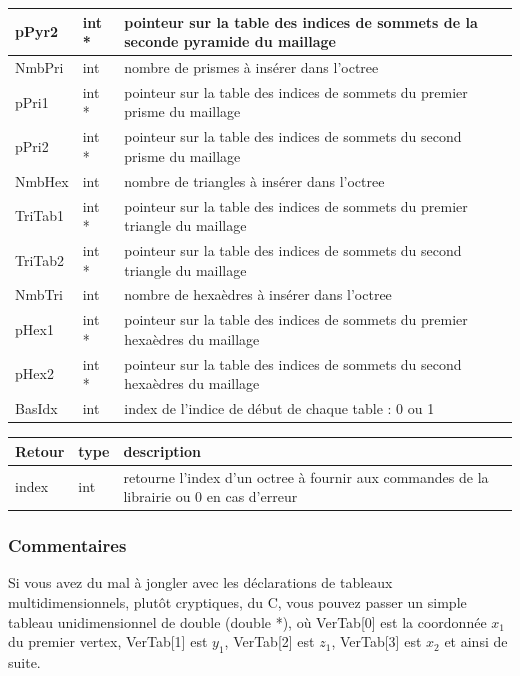 \documentclass[a4paper,12pt]{article}
\begin{document}
\begin{tabular}{|m{2cm}|m{2cm}|m{10cm}|}
\hline
pPyr2      & int *    & pointeur sur la table des indices de sommets de la seconde pyramide du maillage \\
\hline
NmbPri     & int      & nombre de prismes à insérer dans l'octree  \\
\hline
pPri1      & int *    & pointeur sur la table des indices de sommets du premier prisme du maillage \\
\hline
pPri2      & int *    & pointeur sur la table des indices de sommets du second prisme du maillage \\
\hline
NmbHex     & int      & nombre de triangles à insérer dans l'octree  \\
\hline
TriTab1    & int *    & pointeur sur la table des indices de sommets du premier triangle du maillage \\
\hline
TriTab2    & int *    & pointeur sur la table des indices de sommets du second triangle du maillage \\
\hline
NmbTri     & int      & nombre de hexaèdres à insérer dans l'octree  \\
\hline
pHex1      & int *    & pointeur sur la table des indices de sommets du premier hexaèdres du maillage \\
\hline
pHex2      & int *    & pointeur sur la table des indices de sommets du second hexaèdres du maillage \\
\hline
BasIdx     & int      & index de l'indice de début de chaque table : 0 ou 1 \\
\end{tabular}

\medskip

\begin{tabular}{|m{2cm}|m{2cm}|m{10cm}|}
\hline
Retour     & type   & description \\
\hline
index      & int    & retourne l'index d'un octree à fournir aux commandes de la librairie ou 0 en cas d'erreur \\
\hline
\end{tabular}
\subsubsection*{Commentaires}
Si vous avez du mal à jongler avec les déclarations de tableaux multidimensionnels, plutôt cryptiques, du C, vous pouvez passer un simple tableau unidimensionnel de double (double *), où VerTab[0] est la coordonnée $x_1$ du premier vertex, VerTab[1] est $y_1$, VerTab[2] est $z_1$, VerTab[3] est $x_2$ et ainsi de suite.
\end{document}
